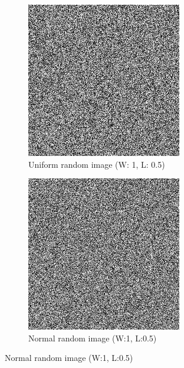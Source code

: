 \documentclass[12pt,english]{article}
\begin{document}
\begin{figure}
	\centering
	\begin{subfigure}[t]{0.4\textwidth}
		\centering
		\includegraphics[width=.9\textwidth]{img/uniformImage}
		\caption{Uniform random image (W: 1, L: 0.5)}
		\label{fig:uni}
	\end{subfigure}%
	\qquad%
	\begin{subfigure}[t]{0.4\textwidth}
		\centering
		\includegraphics[width=.9\textwidth]{img/normalImage}
		\caption{Normal random image (W:1, L:0.5)}
		\label{fig:norm}
	\end{subfigure}%
	

\end{figure}
\end{document}
